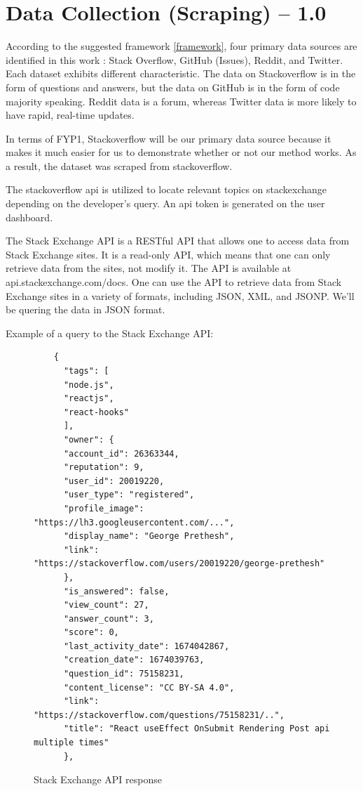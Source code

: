 \section{Data Collection (Scraping) -- 1.0}
According to the suggested framework \ref*{framework}, four primary data sources are identified in this work : Stack Overflow, GitHub (Issues), Reddit, and Twitter. Each dataset exhibits different characteristic. The data on Stackoverflow is in the form of questions and answers, but the data on GitHub is in the form of code majority speaking. Reddit data is a forum, whereas Twitter data is more likely to have rapid, real-time updates.

In terms of FYP1, Stackoverflow will be our primary data source because it makes it much easier for us to demonstrate whether or not our method works. As a result, the dataset was scraped from stackoverflow.

The stackoverflow api is utilized to locate relevant topics on stackexchange depending on the developer's query. An api token is generated on the user dashboard.

The Stack Exchange API is a RESTful API that allows one to access data from Stack Exchange sites. It is a read-only API, which means that one can only retrieve data from the sites, not modify it. The API is available at api.stackexchange.com/docs. One can use the API to retrieve data from Stack Exchange sites in a variety of formats, including JSON, XML, and JSONP. We'll be quering the data in JSON format. 

\pagebreak
Example of a query to the Stack Exchange API:

\begin{figure}[H]
  \begin{lstlisting}
    { 
      "tags": [
      "node.js",
      "reactjs",
      "react-hooks"
      ],
      "owner": {
      "account_id": 26363344,
      "reputation": 9,
      "user_id": 20019220,
      "user_type": "registered",
      "profile_image": "https://lh3.googleusercontent.com/...",
      "display_name": "George Prethesh",
      "link": "https://stackoverflow.com/users/20019220/george-prethesh"
      },
      "is_answered": false,
      "view_count": 27,
      "answer_count": 3,
      "score": 0,
      "last_activity_date": 1674042867,
      "creation_date": 1674039763,
      "question_id": 75158231,
      "content_license": "CC BY-SA 4.0",
      "link": "https://stackoverflow.com/questions/75158231/..",
      "title": "React useEffect OnSubmit Rendering Post api multiple times"
      },
  \end{lstlisting}
  \caption{Stack Exchange API response}
  \label{stack-api}
\end{figure}


